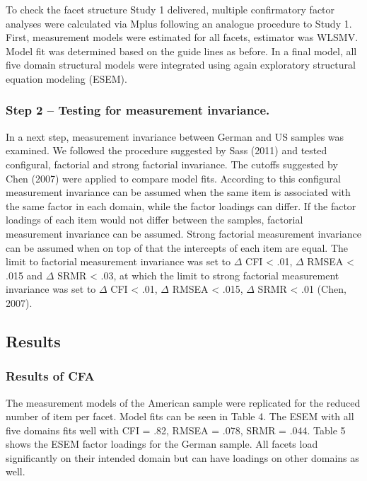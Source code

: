 \documentclass[,man,floatsintext]{apa6}
\theoremstyle{definition}
\theoremstyle{definition}
\theoremstyle{definition}
\theoremstyle{remark}
\begin{document}
To check the facet structure Study 1 delivered, multiple confirmatory
factor analyses were calculated via Mplus following an analogue
procedure to Study 1. First, measurement models were estimated for all
facets, estimator was WLSMV. Model fit was determined based on the guide
lines as before. In a final model, all five domain structural models
were integrated using again exploratory structural equation modeling
(ESEM).

\hypertarget{step-2-testing-for-measurement-invariance.}{%
\subsubsection{Step 2 -- Testing for measurement
invariance.}\label{step-2-testing-for-measurement-invariance.}}

In a next step, measurement invariance between German and US samples was
examined. We followed the procedure suggested by Sass (2011) and tested
configural, factorial and strong factorial invariance. The cutoffs
suggested by Chen (2007) were applied to compare model fits. According
to this configural measurement invariance can be assumed when the same
item is associated with the same factor in each domain, while the factor
loadings can differ. If the factor loadings of each item would not
differ between the samples, factorial measurement invariance can be
assumed. Strong factorial measurement invariance can be assumed when on
top of that the intercepts of each item are equal. The limit to
factorial measurement invariance was set to \(\Delta\) CFI \textless{}
.01, \(\Delta\) RMSEA \textless{} .015 and \(\Delta\) SRMR \textless{}
.03, at which the limit to strong factorial measurement invariance was
set to \(\Delta\) CFI \textless{} .01, \(\Delta\) RMSEA \textless{}
.015, \(\Delta\) SRMR \textless{} .01 (Chen, 2007).

\hypertarget{results-1}{%
\subsection{Results}\label{results-1}}

\hypertarget{results-of-cfa}{%
\subsubsection{Results of CFA}\label{results-of-cfa}}

The measurement models of the American sample were replicated for the
reduced number of item per facet. Model fits can be seen in Table 4. The
ESEM with all five domains fits well with CFI = .82, RMSEA = .078, SRMR
= .044. Table 5 shows the ESEM factor loadings for the German sample.
All facets load significantly on their intended domain but can have
loadings on other domains as well.
\end{document}
